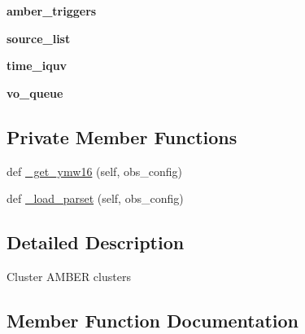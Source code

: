 \begin{DoxyCompactItemize}
{\bfseries amber\+\_\+triggers}
\item 
\mbox{\label{classdarc_1_1amber__clustering_1_1_a_m_b_e_r_clustering_a1e020a2fdd23a10ece1719d4c01a694d}} 
{\bfseries source\+\_\+list}
\item 
\mbox{\label{classdarc_1_1amber__clustering_1_1_a_m_b_e_r_clustering_a6e23ce41d99d7fb660842db4b0777935}} 
{\bfseries time\+\_\+iquv}
\item 
\mbox{\label{classdarc_1_1amber__clustering_1_1_a_m_b_e_r_clustering_a9cdfbb59fe10278de99455466d4968b7}} 
{\bfseries vo\+\_\+queue}
\end{DoxyCompactItemize}
\subsection*{Private Member Functions}
\begin{DoxyCompactItemize}
\item 
def \mbox{\hyperlink{classdarc_1_1amber__clustering_1_1_a_m_b_e_r_clustering_a62cad36e3d3c5668e9b3435b56e84ca7}{\+\_\+get\+\_\+ymw16}} (self, obs\+\_\+config)
\item 
def \mbox{\hyperlink{classdarc_1_1amber__clustering_1_1_a_m_b_e_r_clustering_ad81eb0036c64f14cd02598730dfdc9ef}{\+\_\+load\+\_\+parset}} (self, obs\+\_\+config)
\end{DoxyCompactItemize}


\subsection{Detailed Description}
\begin{DoxyVerb}Cluster AMBER clusters
\end{DoxyVerb}
 

\subsection{Member Function Documentation}
\mbox{\label{classdarc_1_1amber__clustering_1_1_a_m_b_e_r_clustering_a62cad36e3d3c5668e9b3435b56e84ca7}} 
